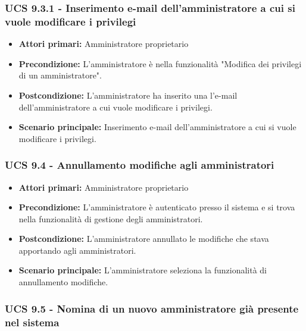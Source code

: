 \subsubsection{UCS 9.3.1 - Inserimento e-mail dell'amministratore a cui si vuole modificare i privilegi}%
\begin{itemize}
\item \textbf{Attori primari:} Amministratore proprietario
\item \textbf{Precondizione:} L'amministratore è nella funzionalità "Modifica dei privilegi di un amministratore".
\item \textbf{Postcondizione:} L'amministratore ha inserito una l'e-mail dell'amministratore a cui vuole modificare i privilegi.
\item \textbf{Scenario principale:} Inserimento e-mail dell'amministratore a cui si vuole modificare i privilegi.
\end{itemize}

\subsubsection{UCS 9.4 - Annullamento modifiche agli amministratori}%

\begin{itemize}
\item \textbf{Attori primari:} Amministratore proprietario
\item \textbf{Precondizione:} L'amministratore è autenticato presso il sistema e si trova nella funzionalità di gestione degli amministratori.
\item \textbf{Postcondizione:} L'amministratore annullato le modifiche che stava apportando agli amministratori.
\item \textbf{Scenario principale:} L'amministratore seleziona la funzionalità di annullamento modifiche.
\end{itemize}

\subsubsection{UCS 9.5 - Nomina di un nuovo amministratore già presente nel sistema}%


